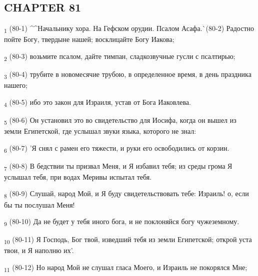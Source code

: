 \subsection{CHAPTER 81}
\begin{tcolorbox}
\textsubscript{1} (80-1) ^^Начальнику хора. На Гефском орудии. Псалом Асафа.^^ (80-2) Радостно пойте Богу, твердыне нашей; восклицайте Богу Иакова;
\end{tcolorbox}
\begin{tcolorbox}
\textsubscript{2} (80-3) возьмите псалом, дайте тимпан, сладкозвучные гусли с псалтирью;
\end{tcolorbox}
\begin{tcolorbox}
\textsubscript{3} (80-4) трубите в новомесячие трубою, в определенное время, в день праздника нашего;
\end{tcolorbox}
\begin{tcolorbox}
\textsubscript{4} (80-5) ибо это закон для Израиля, устав от Бога Иаковлева.
\end{tcolorbox}
\begin{tcolorbox}
\textsubscript{5} (80-6) Он установил это во свидетельство для Иосифа, когда он вышел из земли Египетской, где услышал звуки языка, которого не знал:
\end{tcolorbox}
\begin{tcolorbox}
\textsubscript{6} (80-7) 'Я снял с рамен его тяжести, и руки его освободились от корзин.
\end{tcolorbox}
\begin{tcolorbox}
\textsubscript{7} (80-8) В бедствии ты призвал Меня, и Я избавил тебя; из среды грома Я услышал тебя, при водах Меривы испытал тебя.
\end{tcolorbox}
\begin{tcolorbox}
\textsubscript{8} (80-9) Слушай, народ Мой, и Я буду свидетельствовать тебе: Израиль! о, если бы ты послушал Меня!
\end{tcolorbox}
\begin{tcolorbox}
\textsubscript{9} (80-10) Да не будет у тебя иного бога, и не поклоняйся богу чужеземному.
\end{tcolorbox}
\begin{tcolorbox}
\textsubscript{10} (80-11) Я Господь, Бог твой, изведший тебя из земли Египетской; открой уста твои, и Я наполню их'.
\end{tcolorbox}
\begin{tcolorbox}
\textsubscript{11} (80-12) Но народ Мой не слушал гласа Моего, и Израиль не покорялся Мне;
\end{tcolorbox}
